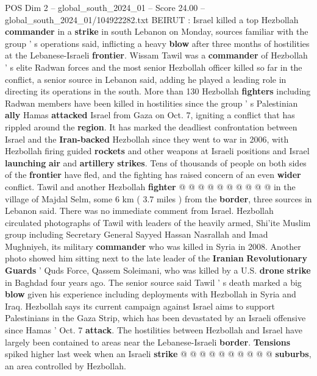 \begin{textsample}{POS Dim 2 – global\_south\_2024\_01 – Score 24.00 – global\_south\_2024\_01/104922282.txt}  \label{ex:f2_pos_097}
BEIRUT : Israel killed a top Hezbollah \textbf{commander} in a \textbf{strike} in south Lebanon on Monday, sources familiar with the group ' s operations said, inflicting a heavy \textbf{blow} after three months of hostilities at the Lebanese-Israeli \textbf{frontier}.
Wissam Tawil was a \textbf{commander} of Hezbollah ' s elite Radwan forces and the most senior Hezbollah officer killed so far in the conflict, a senior source in Lebanon said, adding he played a leading role in directing its operations in the south.
More than 130 Hezbollah \textbf{fighters} including Radwan members have been killed in hostilities since the group ' s Palestinian \textbf{ally} Hamas \textbf{attacked} Israel from Gaza on Oct. 7, igniting a conflict that has rippled around the \textbf{region}.
It has marked the deadliest confrontation between Israel and the \textbf{Iran-backed} Hezbollah since they went to war in 2006, with Hezbollah firing guided \textbf{rockets} and other weapons at Israeli positions and Israel \textbf{launching} \textbf{air} and \textbf{artillery} \textbf{strikes}.
Tens of thousands of people on both sides of the \textbf{frontier} have fled, and the fighting has raised concern of an even \textbf{wider} conflict.
Tawil and another Hezbollah \textbf{fighter} @ @ @ @ @ @ @ @ @ @ in the village of Majdal Selm, some 6 km ( 3.7 miles ) from the \textbf{border}, three sources in Lebanon said.
There was no immediate comment from Israel.
Hezbollah circulated photographs of Tawil with leaders of the heavily armed, Shi'ite Muslim group including Secretary General Sayyed Hassan Nasrallah and Imad Mughniyeh, its military \textbf{commander} who was killed in Syria in 2008.
Another photo showed him sitting next to the late leader of the \textbf{Iranian} \textbf{Revolutionary} \textbf{Guards} ' Quds Force, Qassem Soleimani, who was killed by a U.S. \textbf{drone} \textbf{strike} in Baghdad four years ago.
The senior source said Tawil ' s death marked a big \textbf{blow} given his experience including deployments with Hezbollah in Syria and Iraq.
Hezbollah says its current campaign against Israel aims to support Palestinians in the Gaza Strip, which has been devastated by an Israeli offensive since Hamas ' Oct. 7 \textbf{attack}.
The hostilities between Hezbollah and Israel have largely been contained to areas near the Lebanese-Israeli \textbf{border}. \textbf{Tensions} spiked higher last week when an Israeli \textbf{strike} @ @ @ @ @ @ @ @ @ @ \textbf{suburbs}, an area controlled by Hezbollah.

\end{textsample}

